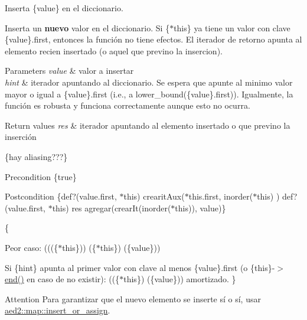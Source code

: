 Inserta \{value\} en el diccionario. 

Inserta un {\bfseries nuevo} valor en el diccionario. Si \{$\ast$this\} ya tiene un valor con clave \{value\}.first, entonces la función no tiene efectos. El iterador de retorno apunta al elemento recien insertado (o aquel que previno la insercion).


\begin{DoxyParams}{Parameters}
{\em value} & valor a insertar \\
\hline
{\em hint} & iterador apuntando al diccionario. Se espera que apunte al minimo valor mayor o igual a \{value\}.first (i.\+e., a lower\+\_\+bound(\{value\}.first)). Igualmente, la función es robusta y funciona correctamente aunque esto no ocurra. \\
\hline
\end{DoxyParams}

\begin{DoxyRetVals}{Return values}
{\em res} & iterador apuntando al elemento insertado o que previno la inserción\\
\hline
\end{DoxyRetVals}
\{hay aliasing???\}

\begin{DoxyPrecond}{Precondition}
\{true\} 
\end{DoxyPrecond}
\begin{DoxyPostcond}{Postcondition}
\{def?(value.\+first, $\ast$this)  crearit\+Aux($\ast$this.first, inorder($\ast$this) )   def?(value.\+first, $\ast$this)  res  agregar(crear\+It(inorder($\ast$this)), value)\}
\end{DoxyPostcond}
\{
\begin{DoxyItemize}
\item Peor caso\+: (((\{$\ast$this\}))  (\{$\ast$this\})  (\{value\}))
\item Si \{hint\} apunta al primer valor con clave al menos \{value\}.first (o \{this\}-\/$>$\hyperlink{classaed2_1_1map_a76023e6a56cb625513e1b5ea028bf983}{end()} en caso de no existir)\+: ((\{$\ast$this\})  (\{value\})) amortizado. \}
\end{DoxyItemize}

\begin{DoxyAttention}{Attention}
Para garantizar que el nuevo elemento se inserte sí o sí, usar \hyperlink{classaed2_1_1map_a2ef6723c183916276b0afc4a4c721475}{aed2\+::map\+::insert\+\_\+or\+\_\+assign}. 
\end{DoxyAttention}
\mbox{\label{classaed2_1_1map_a6941cde9a79c27f054b5c97a587a1854}} 
